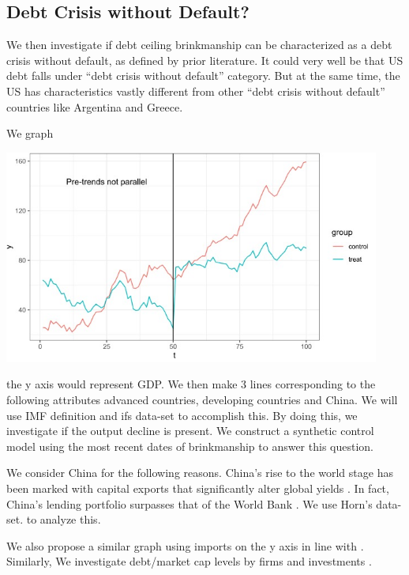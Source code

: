 \documentclass[
  12pt]{article}
\begin{document}
\hypertarget{debt-crisis-without-default-1}{%
\subsection{Debt Crisis without
Default?}\label{debt-crisis-without-default-1}}

We then investigate if debt ceiling brinkmanship can be characterized as
a debt crisis without default, as defined by prior literature. It could
very well be that US debt falls under ``debt crisis without default''
category. But at the same time, the US has characteristics vastly
different from other ``debt crisis without default'' countries like
Argentina and Greece.

We graph

\includegraphics[width=4.875in,height=\textheight]{style-guide/1_year_ERP_parallel_trends.jpeg}

the y axis would represent GDP. We then make 3 lines corresponding to
the following attributes advanced countries, developing countries and
China. We will use IMF definition and ifs data-set to accomplish this.
By doing this, we investigate if the output decline \citep{yeyati2011}
is present. We construct a synthetic control model using the most recent
dates of brinkmanship to answer this question.

We consider China for the following reasons. China's rise to the world
stage has been marked with capital exports that significantly alter
global yields \citep{alfaro2014, gourinchas}. In fact, China's lending
portfolio surpasses that of the World Bank \citep{horn2021} . We use
Horn's data-set. to analyze this.

We also propose a similar graph using imports on the y axis in line with
\citep{mendoza2012}. Similarly, We investigate debt/market cap levels by
firms \citep{corsetti2012, das2010, gourinchas2016} and investments
\citep{almeida2017}.
\end{document}
